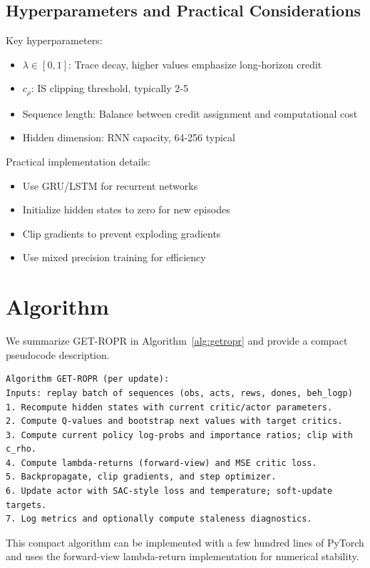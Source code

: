 \documentclass{article}
\begin{document}
\subsection{Hyperparameters and Practical Considerations}
Key hyperparameters:
\begin{itemize}
  \item \(\lambda \in [0,1]\): Trace decay, higher values emphasize long-horizon credit
  \item \(c_\rho\): IS clipping threshold, typically 2-5
  \item Sequence length: Balance between credit assignment and computational cost
  \item Hidden dimension: RNN capacity, 64-256 typical
\end{itemize}

Practical implementation details:
\begin{itemize}
  \item Use GRU/LSTM for recurrent networks
  \item Initialize hidden states to zero for new episodes
  \item Clip gradients to prevent exploding gradients
  \item Use mixed precision training for efficiency
\end{itemize}

\section{Algorithm}
We summarize GET-ROPR in Algorithm~\ref{alg:getropr} and provide a compact pseudocode description.

\begin{verbatim}
Algorithm GET-ROPR (per update):
Inputs: replay batch of sequences (obs, acts, rews, dones, beh_logp)
1. Recompute hidden states with current critic/actor parameters.
2. Compute Q-values and bootstrap next values with target critics.
3. Compute current policy log-probs and importance ratios; clip with c_rho.
4. Compute lambda-returns (forward-view) and MSE critic loss.
5. Backpropagate, clip gradients, and step optimizer.
6. Update actor with SAC-style loss and temperature; soft-update targets.
7. Log metrics and optionally compute staleness diagnostics.
\end{verbatim}

This compact algorithm can be implemented with a few hundred lines of PyTorch and
uses the forward-view lambda-return implementation for numerical stability.
\end{document}
